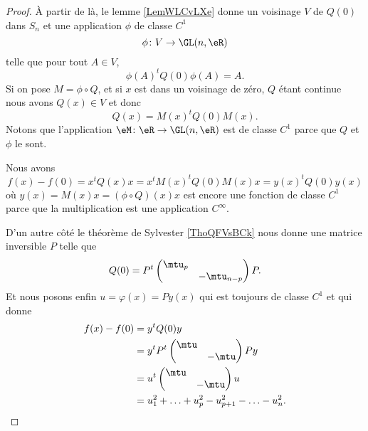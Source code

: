\begin{proof}
    À partir de là, le lemme \ref{LemWLCvLXe} donne un voisinage \( V\) de \( Q(0)\) dans \( S_n\) et une application \( \phi\) de classe \( C^1\)
    \begin{equation}
            \phi\colon V\to \GL(n,\eR) \\
    \end{equation}
    telle que pour tout \( A\in V\),
    \begin{equation}
        \phi(A)^tQ(0)\phi(A)=A.
    \end{equation}
    Si on pose \( M=\phi\circ Q\), et si \( x\) est dans un voisinage de zéro, \( Q\) étant continue nous avons \( Q(x)\in V\) et donc
    \begin{equation}
        Q(x)=M(x)^tQ(0)M(x).
    \end{equation}
    Notons que l'application \( \eM\colon \eR\to \GL(n,\eR)\) est de classe \( C^1\) parce que \( Q\) et \( \phi\) le sont.

    Nous avons
    \begin{equation}
        f(x)-f(0)=x^tQ(x)x=x^tM(x)^tQ(0)M(x)x=y(x)^tQ(0)y(x)
    \end{equation}
    où \( y(x)=M(x)x=(\phi\circ Q)(x)x\) est encore une fonction de classe \( C^1\) parce que la multiplication est une application \(  C^{\infty}\).

    D'un autre côté le théorème de Sylvester \ref{ThoQFVsBCk} nous donne une matrice inversible \( P\) telle que
    \begin{equation}
        Q(0)=P^t\begin{pmatrix}
            \mtu_p    &       \\ 
            &   -\mtu_{n-p}    
        \end{pmatrix}P.
    \end{equation}
    Et nous posons enfin \( u=\varphi(x)=Py(x)\) qui est toujours de classe \( C^1\) et qui donne
    \begin{subequations}
        \begin{align}
            f(x)-f(0)&=y^tQ(0)y\\
            &=y^tP^t\begin{pmatrix}
                \mtu    &       \\ 
                    &   -\mtu    
            \end{pmatrix}Py\\
            &=u^t\begin{pmatrix}
                \mtu    &       \\ 
                    &   -\mtu    
            \end{pmatrix}u\\
            &=u_1^2+\ldots +u_p^2-u_{p+1}^2-\ldots -u_n^2.
        \end{align}
    \end{subequations}
    

\end{proof}
